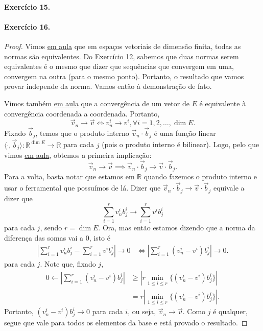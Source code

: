 \documentclass[12pt,a4paper]{article}
\begin{document}
\paragraph{Exercício 15.}

\paragraph{Exercício 16.}
\begin{proof}
Vimos \href{https://www.youtube.com/watch?v=wszq-PtjOk4&list=PLMG2ETzS-iy95U-hwPhPRSGRHBFm8Dk2x&index=7}{em aula} que em espaços
vetoriais de dimensão finita, todas as normas são equivalentes. Do Exercício 12, sabemos que duas normas serem equivalentes é o
mesmo que dizer que sequências que convergem em uma, convergem na outra (para o mesmo ponto). 
Portanto, o resultado que vamos provar independe da norma. Vamos então à demonstração de fato.

Vimos também \href{https://www.youtube.com/watch?v=ph3VUO0AVRA&list=PLMG2ETzS-iy95U-hwPhPRSGRHBFm8Dk2x&index=5}{em aula} que
a convergência de um vetor de $E$ é equivalente à convergência coordenada a coordenada. Portanto,
\begin{equation*}
    \vec{v}_n \to \vec{v} \iff v_n^i \to v^i, \forall i = 1, 2, \dots, \dim E.
\end{equation*}
Fixado $\vec{b}_j$, temos que o produto interno $\vec{v}_n\cdot\vec{b}_j$ é uma função linear
$\langle \cdot, \vec{b}_j \rangle: \mathbb{R}^{\dim E} \to \mathbb{R}$ para cada $j$ (pois o produto interno é bilinear). Logo, 
pelo que vimos \href{https://www.youtube.com/watch?v=ph3VUO0AVRA&list=PLMG2ETzS-iy95U-hwPhPRSGRHBFm8Dk2x&index=5}{em aula},
obtemos a primeira implicação: 
\begin{equation*}
\vec{v}_n \to \vec{v} \implies \vec{v}_n\cdot \vec{b}_j \to \vec{v}\cdot\vec{b}_j.
\end{equation*}
Para a volta, basta notar que estamos em $\mathbb{R}$ quando fazemos o produto interno e usar o ferramental que possuímos de lá.
Dizer que $\vec{v}_n\cdot \vec{b}_j \to \vec{v}\cdot\vec{b}_j$ equivale a dizer que
\begin{equation*}
    \sum_{i=1}^r v_n^i b_j^i \to \sum_{i=1}^r v^i b_j^i
\end{equation*}
para cada $j$, sendo $r = \dim E$. Ora, mas então estamos dizendo que a norma da diferença das somas vai a 0, isto é
\begin{align*}
    \left|\sum_{i=1}^r v_n^i b_j^i -\sum_{i=1}^r v^i b_j^i\right| \to 0 &\iff \left| \sum_{i=1}^r (v_n^i - v^i) b_j^i \right| \to 0.
\end{align*}
para cada $j$. Note que, fixado $j$,
\begin{align*}
    0 \leftarrow \left| \sum_{i=1}^r (v_n^i - v^i) b_j^i \right| &\geq \left| r\min_{1\leq i\leq r}\{(v_n^i - v^i) b_j^i\} \right| \\
    &= r \left| \min_{1\leq i\leq r}\{(v_n^i - v^i) b_j^i\} \right|.
\end{align*}
Portanto, $(v_n^i - v^i)b_j^i \to 0$ para cada $i$, ou seja, $\vec{v}_n \to \vec{v}$. Como $j$ é qualquer, segue que vale 
para todos os elementos da base e está provado o resultado.
\end{proof}
\end{document}
